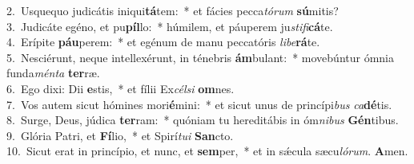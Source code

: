 {2.~}Usquequo judicátis iniqui\textbf{tá}tem:~* et fácies pecca\textit{tó}\textit{rum} \textbf{sú}mitis?\\
{3.~}Judicáte egéno, et pu\textbf{píl}lo:~* húmilem, et páuperem ju\textit{sti}\textit{fi}\textbf{cá}te.\\
{4.~}Erípite \textbf{páu}perem:~* et egénum de manu peccatóris \textit{li}\textit{be}\textbf{rá}te.\\
{5.~}Nesciérunt, neque intellexérunt, in ténebris \textbf{ám}bulant:~* movebúntur ómnia funda\textit{mén}\textit{ta} \textbf{ter}ræ.\\
{6.~}Ego dixi: Dii \textbf{e}stis,~* et fílii Ex\textit{cél}\textit{si} \textbf{om}nes.\\
{7.~}Vos autem sicut hómines mori\textbf{é}mini:~* et sicut unus de princípi\textit{bus} \textit{ca}\textbf{dé}tis.\\
{8.~}Surge, Deus, júdica \textbf{ter}ram:~* quóniam tu hereditábis in óm\textit{ni}\textit{bus} \textbf{Gén}tibus.\\
{9.~}Glória Patri, et \textbf{Fí}lio,~* et Spirí\textit{tu}\textit{i} \textbf{San}cto.\\
{10.~}Sicut erat in princípio, et nunc, et \textbf{sem}per,~* et in sǽcula sæcu\textit{ló}\textit{rum}. \textbf{A}men.\\
